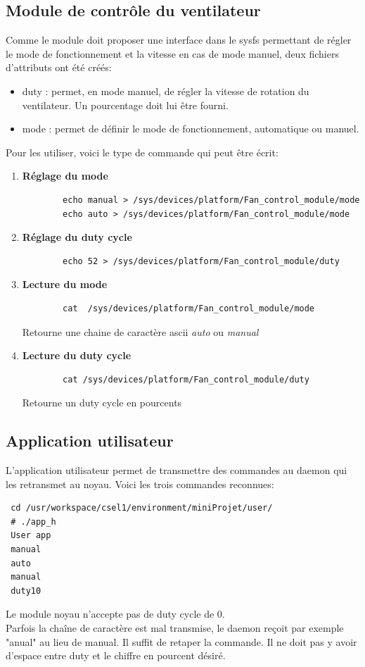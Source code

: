 \subsection{Module de contrôle du ventilateur}
Comme le module doit proposer une interface dans le sysfs permettant de régler le mode de fonctionnement et la vitesse en cas de mode manuel, deux fichiers d'attributs ont été créés:
\begin{itemize}
	\item duty : permet, en mode manuel, de régler la vitesse de rotation du ventilateur. Un pourcentage doit lui être fourni.
	\item mode : permet de définir le mode de fonctionnement, automatique ou manuel. 
\end{itemize}
Pour les utiliser, voici le type de commande qui peut être écrit:\\
\begin{enumerate}
	\item \textbf{Réglage du mode}\\
	\begin{lstlisting}
		echo manual > /sys/devices/platform/Fan_control_module/mode
		echo auto > /sys/devices/platform/Fan_control_module/mode
	\end{lstlisting}
	\item \textbf{Réglage du duty cycle}
	\begin{lstlisting}
		echo 52 > /sys/devices/platform/Fan_control_module/duty
	\end{lstlisting}
	\item \textbf{Lecture du mode}
	\begin{lstlisting}
		cat  /sys/devices/platform/Fan_control_module/mode
	\end{lstlisting}
	Retourne une chaine de caractère ascii \textit{auto} ou \textit{manual}
	\item \textbf{Lecture du duty cycle}
	\begin{lstlisting}
		cat /sys/devices/platform/Fan_control_module/duty 
	\end{lstlisting}
	Retourne un duty cycle en pourcents
\end{enumerate}

\subsection{Application utilisateur}
L'application utilisateur permet de transmettre des commandes au daemon qui les retransmet au noyau. Voici les trois commandes reconnues:
\begin{lstlisting}
 cd /usr/workspace/csel1/environment/miniProjet/user/
 # ./app_h 
 User app
 manual
 auto
 manual
 duty10
\end{lstlisting}
Le module noyau n'accepte pas de duty cycle de 0.\\
Parfois la chaîne de caractère est mal transmise, le daemon reçoit par exemple "anual" au lieu de manual. Il suffit de retaper la commande. Il ne doit pas y avoir d'espace entre duty et le chiffre en pourcent désiré.
